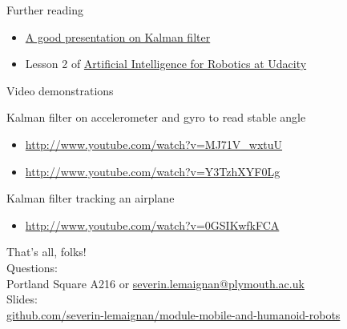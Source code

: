 \documentclass[compress]{beamer}
\begin{document}
\begin{frame}{Further reading}


\begin{itemize}
    \item \href{http://www.cs.unc.edu/~welch/media/pdf/kalman_intro.pdf}{A good presentation on Kalman filter}
    \item Lesson 2 of \href{https://www.udacity.com/course/cs373}{Artificial Intelligence for Robotics at Udacity}
\end{itemize}

Video demonstrations

Kalman filter on accelerometer and gyro to read stable angle

\begin{itemize}
    \item \url{http://www.youtube.com/watch?v=MJ71V_wxtuU}
    \item \url{http://www.youtube.com/watch?v=Y3TzhXYF0Lg}
\end{itemize}

Kalman filter tracking an airplane

\begin{itemize}
    \item \url{http://www.youtube.com/watch?v=0GSIKwfkFCA}
\end{itemize}

\end{frame}


\begin{frame}{}
    \begin{center}
        \Large
        That's all, folks!\\[2em]
        \normalsize
        Questions:\\
        Portland Square A216 or \url{severin.lemaignan@plymouth.ac.uk} \\[1em]

        Slides:\\ \href{https://github.com/severin-lemaignan/module-mobile-and-humanoid-robots}{\small github.com/severin-lemaignan/module-mobile-and-humanoid-robots}

    \end{center}
\end{frame}
\end{document}
